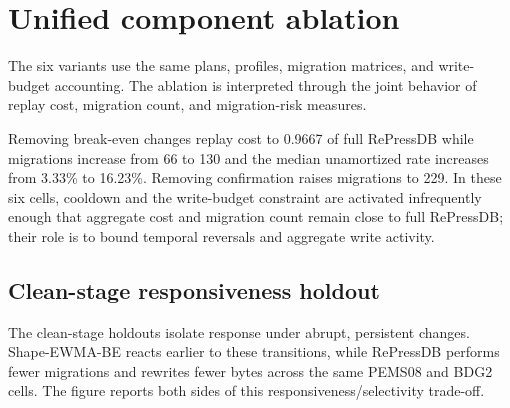 \documentclass[preprint,12pt,authoryear]{elsarticle}
\begin{document}
\section{Unified component ablation}

The six variants use the same plans, profiles, migration matrices, and write-budget accounting. The ablation is interpreted through the joint behavior of replay cost, migration count, and migration-risk measures.

\begin{table}[H]
\centering
\caption{Ablation results.}
\end{table}

Removing break-even changes replay cost to 0.9667 of full RePressDB while migrations increase from 66 to 130 and the median unamortized rate increases from 3.33\% to 16.23\%. Removing confirmation raises migrations to 229. In these six cells, cooldown and the write-budget constraint are activated infrequently enough that aggregate cost and migration count remain close to full RePressDB; their role is to bound temporal reversals and aggregate write activity.

\subsection{Clean-stage responsiveness holdout}
The clean-stage holdouts isolate response under abrupt, persistent changes. Shape-EWMA-BE reacts earlier to these transitions, while RePressDB performs fewer migrations and rewrites fewer bytes across the same PEMS08 and BDG2 cells. The figure reports both sides of this responsiveness/selectivity trade-off.
\end{document}
